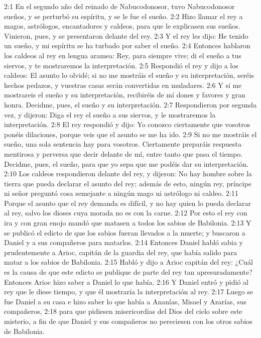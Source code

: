 2:1 En el segundo año del reinado de Nabucodonosor, tuvo Nabucodonosor sueños, y se perturbó su espíritu, y se le fue el sueño. 
2:2 Hizo llamar el rey a magos, astrólogos, encantadores y caldeos, para que le explicasen sus sueños. Vinieron, pues, y se presentaron delante del rey. 
2:3 Y el rey les dijo: He tenido un sueño, y mi espíritu se ha turbado por saber el sueño. 
2:4 Entonces hablaron los caldeos al rey en lengua aramea: Rey, para siempre vive; di el sueño a tus siervos, y te mostraremos la interpretación. 
2:5 Respondió el rey y dijo a los caldeos: El asunto lo olvidé; si no me mostráis el sueño y su interpretación, seréis hechos pedazos, y vuestras casas serán convertidas en muladares. 
2:6 Y si me mostrareis el sueño y su interpretación, recibiréis de mí dones y favores y gran honra. Decidme, pues, el sueño y su interpretación. 
2:7 Respondieron por segunda vez, y dijeron: Diga el rey el sueño a sus siervos, y le mostraremos la interpretación. 
2:8 El rey respondió y dijo: Yo conozco ciertamente que vosotros ponéis dilaciones, porque veis que el asunto se me ha ido. 
2:9 Si no me mostráis el sueño, una sola sentencia hay para vosotros. Ciertamente preparáis respuesta mentirosa y perversa que decir delante de mí, entre tanto que pasa el tiempo. Decidme, pues, el sueño, para que yo sepa que me podéis dar su interpretación. 
2:10 Los caldeos respondieron delante del rey, y dijeron: No hay hombre sobre la tierra que pueda declarar el asunto del rey; además de esto, ningún rey, príncipe ni señor preguntó cosa semejante a ningún mago ni astrólogo ni caldeo. 
2:11 Porque el asunto que el rey demanda es difícil, y no hay quien lo pueda declarar al rey, salvo los dioses cuya morada no es con la carne. 
2:12 Por esto el rey con ira y con gran enojo mandó que matasen a todos los sabios de Babilonia. 
2:13 Y se publicó el edicto de que los sabios fueran llevados a la muerte; y buscaron a Daniel y a sus compañeros para matarlos. 
2:14 Entonces Daniel habló sabia y prudentemente a Arioc, capitán de la guardia del rey, que había salido para matar a los sabios de Babilonia. 
2:15 Habló y dijo a Arioc capitán del rey: ¿Cuál es la causa de que este edicto se publique de parte del rey tan apresuradamente? Entonces Arioc hizo saber a Daniel lo que había. 
2:16 Y Daniel entró y pidió al rey que le diese tiempo, y que él mostraría la interpretación al rey. 
2:17 Luego se fue Daniel a su casa e hizo saber lo que había a Ananías, Misael y Azarías, sus compañeros, 
2:18 para que pidiesen misericordias del Dios del cielo sobre este misterio, a fin de que Daniel y sus compañeros no pereciesen con los otros sabios de Babilonia. 
